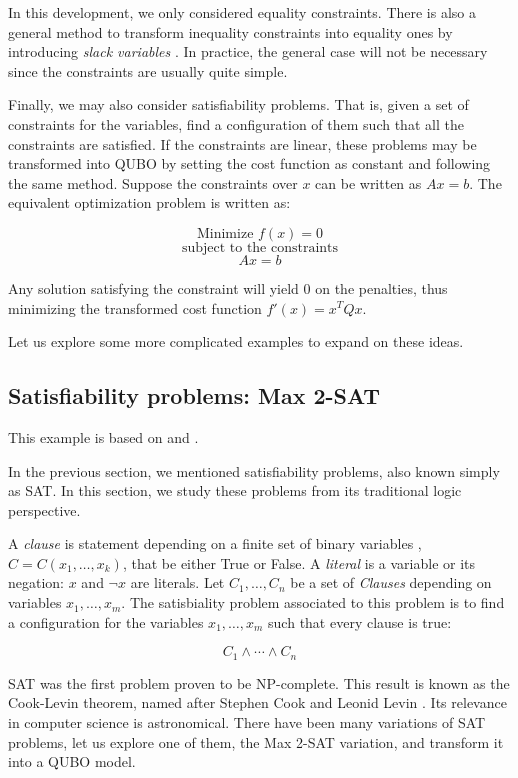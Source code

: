 In this development, we only considered equality constraints. There is also a general method to transform inequality constraints into equality ones by introducing \emph{slack variables} \cite{Hull2003}. In practice, the general case will not be necessary since the constraints are usually quite simple.

Finally, we may also consider satisfiability problems. That is, given a set of constraints for the variables, find a configuration of them such that all the constraints are satisfied. If the constraints are linear, these problems may be transformed into QUBO by setting the cost function as constant and following the same method. Suppose the constraints over $x$ can be written as $Ax = b$. The equivalent optimization problem is written as:

$$ \text{Minimize } f(x) = 0 $$
$$ \text{subject to the constraints} $$
$$ Ax = b $$

Any solution satisfying the constraint will yield $0$ on the penalties, thus minimizing the transformed cost function $f'(x) = x^T Q x$. 

Let us explore some more complicated examples to expand on these ideas.


\subsection{Satisfiability problems: Max 2-SAT}


This example is based on \cite{Glover2019} and \cite{Farhi2000}.

In the previous section, we mentioned satisfiability problems, also known simply as SAT. In this section, we study these problems from its traditional logic perspective.

A \emph{clause} is statement depending on a finite set of binary variables , $C = C(x_1, \ldots, x_k)$, that be either True or False. A \emph{literal} is a variable or its negation: $x$ and $\neg x$ are literals. Let $C_1, \ldots, C_n$ be a set of \emph{Clauses} depending on variables $x_1, \ldots, x_m$. The satisbiality problem associated to this problem is to find a configuration for the variables $x_1, \ldots, x_m$ such that every clause is true:

$$ C_1 \wedge \cdots \wedge C_n $$

SAT was the first problem proven to be NP-complete. This result is known as the Cook-Levin theorem, named after Stephen Cook and Leonid Levin \cite{Book1980}. Its relevance in computer science is astronomical. There have been many variations of SAT problems, let us explore one of them, the Max 2-SAT variation, and transform it into a QUBO model.

